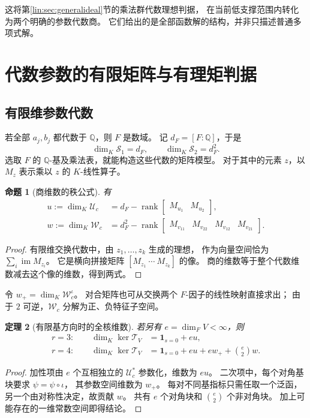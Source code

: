 \documentclass[11pt,a4paper,oneside,openany]{book}
\theoremstyle{lecture}
\newtheorem{theorem}{定理}[section]
\newtheorem{proposition}[theorem]{命题}
\newcommand{\Q}{\mathbb Q}
\newcommand{\im}{\operatorname{im}}
\newcommand{\T}{\mathcal T}
\newcommand{\Uc}{\mathscr U_c}
\newcommand{\Wc}{\mathscr W_c}
\DeclareMathOperator{\rank}{rank}
\numberwithin{equation}{section}
\begin{document}
这将第\ref{lin:sec:generalideal}节的乘法群代数理想判据，
在当前低支撑范围内转化为两个明确的参数代数商。
它们给出的是全部函数解的结构，并非只描述普通多项式解。

\section{代数参数的有限矩阵与有理矩判据}\label{lin:sec:algebraic}
\subsection{有限维参数代数}
若全部 $a_j,b_j$ 都代数于 $\Q$，则 $F$ 是数域。
记 $d_F=[F:\Q]$，于是
\[
 \dim_K\mathscr S_1=d_F,\qquad
 \dim_K\mathscr S_2=d_F^2.
\]
选取 $F$ 的 $\Q$-基及乘法表，就能构造这些代数的矩阵模型。
对于其中的元素 $z$，以 $M_z$ 表示乘以 $z$ 的 $K$-线性算子。

\begin{proposition}[商维数的秩公式]\label{lin:prop:matrixquotient}
有
\[
 \begin{aligned}
 u:=\dim_K\Uc
 &=d_F-\rank\begin{bmatrix}M_{u_1}&M_{u_2}\end{bmatrix},\\
 w:=\dim_K\Wc
 &=d_F^2-\rank
 \begin{bmatrix}M_{v_{11}}&M_{v_{22}}&M_{v_{12}}&M_{v_{21}}\end{bmatrix}.
 \end{aligned}
\]
\end{proposition}
\begin{proof}
有限维交换代数中，由 $z_1,\ldots,z_k$ 生成的理想，
作为向量空间恰为 $\sum_i\im M_{z_i}$。
它是横向拼接矩阵 $[M_{z_1}\ \cdots\ M_{z_k}]$ 的像。
商的维数等于整个代数维数减去这个像的维数，得到两式。
\end{proof}

令 $w_+=\dim_K\Wc^\iota$。
对合矩阵也可从交换两个 $F$-因子的线性映射直接求出；
由于 $2$ 可逆，$\Wc$ 分解为正、负特征子空间。

\begin{theorem}[有限基方向时的全核维数]\label{lin:thm:dimension}
若另有 $e=\dim_FV<\infty$，则
\[
 \begin{aligned}
 r=3:\qquad
 \dim_K\ker\T_V
 &=\mathbf1_{s=0}+eu,\\
 r=4:\qquad
 \dim_K\ker\T_V
 &=\mathbf1_{s=0}+eu+e w_+ +\binom e2w.
 \end{aligned}
\]
\end{theorem}
\begin{proof}
加性项由 $e$ 个互相独立的 $\Uc^*$ 参数化，维数为 $eu$。
二次项中，每个对角基块要求 $\psi=\psi\circ\iota$，
其参数空间维数为 $w_+$。
每对不同基指标只需任取一个泛函，另一个由对称性决定，故贡献 $w$。
共有 $e$ 个对角块和 $\binom e2$ 个非对角块。
加上可能存在的一维常数空间即得结论。
\end{proof}
\end{document}
